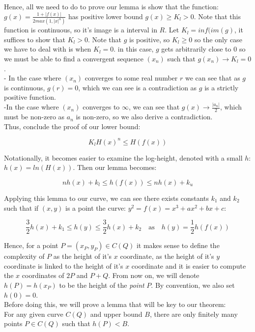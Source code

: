 \documentclass{article}
\begin{document}
Hence, all we need to do to prove our lemma is show that the function: $g(x) = \frac{1 + |f(x)|}{2 max(1, |x|^n)}$ has positive lower bound $g(x) \geq K_l > 0$. Note that this function is continuous, so it's image is a interval in $R$. Let $K_l = inf(im(g)$, it suffices to show that $K_l > 0$. Note that $g$ is positive, so $K_l \geq 0$ so the only case we have to deal with is when $K_l = 0$. in this case, $g$ gets arbitrarily close to $0$ so we must be able to find a convergent sequence $(x_n)$ such that $g(x_n) \rightarrow K_l = 0$. \\

- In the case where $(x_n)$ converges to some real number $r$ we can see that as $g$ is continuous, $g(r) = 0$, which we can see is a contradiction as $g$ is a strictly positive function.\\

-In the case where $(x_n)$ converges to $\infty$, we can see that $g(x) \rightarrow \frac{|a_n|}{2}$, which must be non-zero as $a_n$ is non-zero, so we also derive a contradiction.\\

Thus, conclude the proof of our lower bound:

\[ K_l H(x)^n \leq H(f(x)) \]

Notationally, it becomes easier to examine the log-height, denoted with a small $h$: $h(x) = ln(H(x))$. Then our lemma becomes:

\[ n h(x) + k_l \leq h(f(x)) \leq n h(x) + k_u \]

Applying this lemma to our curve, we can see there exists constants $k_1$ and $k_2$ such that if $(x, y)$ is a point the curve: $y^2 = f(x) = x^3 + ax^2 + bx + c$:

\[ \frac{3}{2} h(x) + k_1 \leq h(y) \leq \frac{3}{2} h(x) + k_2 \quad \text{as} \quad h(y) = \frac{1}{2}h(f(x)) \]

Hence, for a point $P = (x_P, y_P) \in C(Q)$ it makes sense to define the complexity of $P$ as the height of it's $x$ coordinate, as the height of it's $y$ coordinate is linked to the height of it's $x$ coordinate and it is easier to compute the $x$ coordinates of $2P$ and $P + Q$. From now on, we will denote $h(P) = h(x_P)$ to be the height of the \emph{point} $P$. By convention, we also set $h(0) = 0$.\\

Before doing this, we will prove a lemma that will be key to our theorem:\\

For any given curve $C(Q)$ and upper bound $B$, there are only finitely many points $P \in C(Q)$ such that $h(P) < B$.\\
\end{document}
